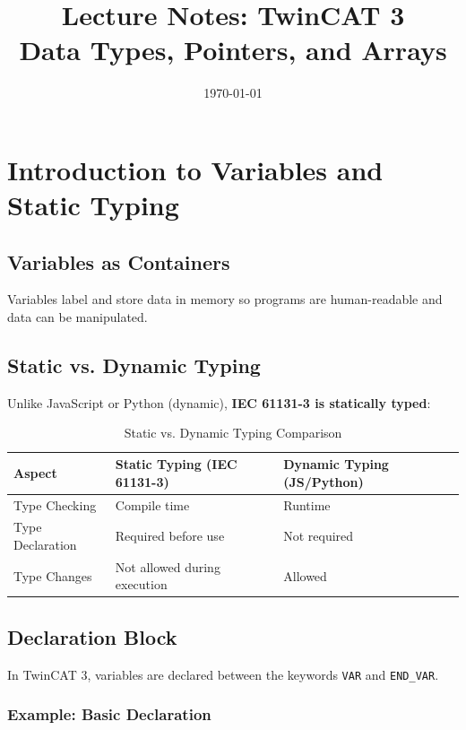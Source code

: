 \documentclass[11pt,a4paper]{article}
\title{
    \vspace{-1cm}
    \textbf{Lecture Notes: TwinCAT 3}\\
    \Large Data Types, Pointers, and Arrays
}
\author{}
\date{\today}
\begin{document}
\maketitle

\tableofcontents
\newpage

\section{Introduction to Variables and Static Typing}

\subsection{Variables as Containers}

Variables label and store data in memory so programs are human-readable and data can be manipulated.

\subsection{Static vs. Dynamic Typing}

Unlike JavaScript or Python (dynamic), \textbf{IEC 61131-3 is statically typed}:

\begin{table}[h]
\centering
\begin{tabular}{@{}lll@{}}
\toprule
\textbf{Aspect} & \textbf{Static Typing (IEC 61131-3)} & \textbf{Dynamic Typing (JS/Python)} \\
\midrule
Type Checking & Compile time & Runtime \\
Type Declaration & Required before use & Not required \\
Type Changes & Not allowed during execution & Allowed \\
\bottomrule
\end{tabular}
\caption{Static vs. Dynamic Typing Comparison}
\end{table}

\subsection{Declaration Block}

In TwinCAT 3, variables are declared between the keywords \texttt{VAR} and \texttt{END\_VAR}.

\subsubsection*{Example: Basic Declaration}
\end{document}
